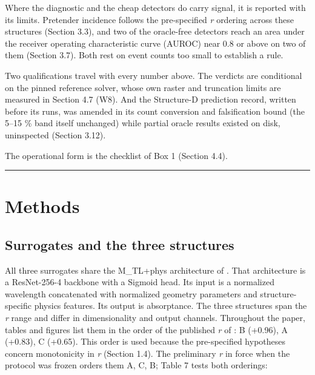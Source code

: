\documentclass[11pt,a4paper]{article}
\begin{document}
Where the diagnostic and the cheap detectors do carry signal, it is reported with its limits. Pretender incidence follows the pre-specified \emph{r}
ordering across these structures (Section 3.3), and two of the oracle-free detectors reach an area under the receiver operating characteristic curve (AUROC) near 0.8 or above on two of them (Section 3.7). Both rest on event counts too
small to establish a rule.

Two qualifications travel with every number above. The verdicts are conditional on the
pinned reference solver, whose own raster and truncation limits are measured in Section 4.7
(W8). And the Structure-D prediction record, written before its runs, was amended in its
count conversion and falsification bound (the 5--15 \% band itself unchanged) while partial
oracle results existed on disk, uninspected (Section 3.12).

The operational form is the checklist of Box 1 (Section 4.4).

\begin{center}\rule{0.5\linewidth}{0.5pt}\end{center}

\section{Methods}\label{sec:2}

\subsection{Surrogates and the three structures}\label{sec:2.1}

All three surrogates share the M\_TL+phys architecture of \cite{choi20261}. That architecture is a
ResNet-256-4 backbone with a Sigmoid head. Its input is a normalized wavelength
concatenated with normalized geometry parameters and structure-specific physics
features. Its output is absorptance. The three structures span the \emph{r} range and differ in dimensionality and output channels. Throughout the paper, tables and figures list them in the order of the published \emph{r} of \cite{choi20261}: B (+0.96), A (+0.83), C (+0.65). This order is used because the pre-specified hypotheses concern monotonicity in \emph{r} (Section 1.4). The preliminary \emph{r} in force when the protocol was frozen orders them A, C, B; Table 7 tests both orderings:
\end{document}

